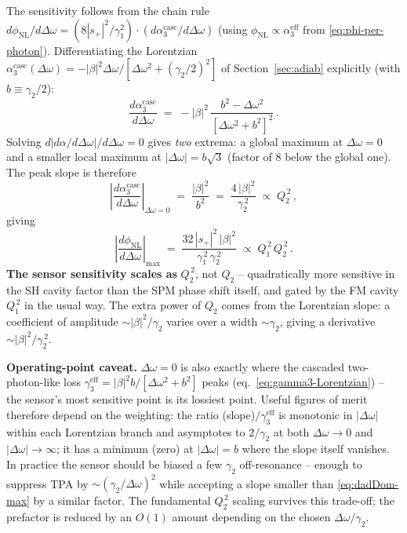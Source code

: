 \documentclass[11pt,a4paper]{article}
\newcommand{\Dom}{\Delta\omega}
\begin{document}
The sensitivity follows from the chain rule
$d\phi_\text{NL}/d\Dom=(8|s_+|^{2}/\gamma_1^{2})\cdot(d\alpha_3^\text{casc}/d\Dom)$
(using $\phi_\text{NL}\propto\alpha_3^\text{eff}$ from
\eqref{eq:phi-per-photon}).  Differentiating the Lorentzian
$\alpha_3^\text{casc}(\Dom)=-|\beta|^{2}\Dom/[\Dom^{2}+(\gamma_2/2)^{2}]$
of Section~\ref{sec:adiab} explicitly (with $b\equiv\gamma_2/2$):
\begin{equation}
  \frac{d\alpha_3^\text{casc}}{d\Dom}\;=\;-|\beta|^{2}\,
        \frac{b^{2}-\Dom^{2}}{[\Dom^{2}+b^{2}]^{2}}\,.
  \label{eq:dadDom}
\end{equation}
Solving $d|d\alpha/d\Dom|/d\Dom=0$ gives \emph{two} extrema: a global
maximum at $\Dom=0$ and a smaller local maximum at $|\Dom|=b\sqrt{3}$
(factor of $8$ below the global one).  The peak slope is therefore
\begin{equation}
  \boxed{\;
    \left|\frac{d\alpha_3^\text{casc}}{d\Dom}\right|_{\Dom=0}
     \;=\;\frac{|\beta|^{2}}{b^{2}}
     \;=\;\frac{4\,|\beta|^{2}}{\gamma_2^{\,2}}
     \;\propto\;Q_2^{\,2}\,,
  \;}
  \label{eq:dadDom-max}
\end{equation}
giving
\begin{equation}
   \left|\frac{d\phi_\text{NL}}{d\Dom}\right|_\text{max}
     \;=\;\frac{32\,|s_+|^{2}\,|\beta|^{2}}{\gamma_1^{\,2}\,\gamma_2^{\,2}}
     \;\propto\;Q_1^{\,2}\,Q_2^{\,2}\,.
\end{equation}
\textbf{The sensor sensitivity scales as} $Q_2^{\,2}$, not $Q_2$ --
quadratically more sensitive in the SH cavity factor than the SPM
phase shift itself, and gated by the FM cavity $Q_1^{\,2}$ in the
usual way.  The extra power of $Q_2$ comes from the Lorentzian slope:
a coefficient of amplitude $\sim |\beta|^{2}/\gamma_2$ varies over a
width $\sim\gamma_2$, giving a derivative $\sim|\beta|^{2}/\gamma_2^{\,2}$.

\textbf{Operating-point caveat.}  $\Dom=0$ is also exactly where the
cascaded two-photon-like loss
$\gamma_3^\text{eff}=|\beta|^{2}b/[\Dom^{2}+b^{2}]$ peaks
(eq.~\eqref{eq:gamma3-Lorentzian}) -- the sensor's most sensitive
point is its lossiest point.  Useful figures of merit therefore
depend on the weighting: the ratio (slope)$/\gamma_3^\text{eff}$ is
monotonic in $|\Dom|$ within each Lorentzian branch and asymptotes
to $2/\gamma_2$ at both $\Dom\to 0$ and $|\Dom|\to\infty$; it has a
minimum (zero) at $|\Dom|=b$ where the slope itself vanishes.  In
practice the sensor should be biased a few $\gamma_2$ off-resonance
-- enough to suppress TPA by $\sim(\gamma_2/\Dom)^{2}$ while
accepting a slope smaller than \eqref{eq:dadDom-max} by a similar
factor.  The fundamental $Q_2^{\,2}$ scaling survives this
trade-off; the prefactor is reduced by an $O(1)$ amount depending
on the chosen $\Dom/\gamma_2$.
\end{document}
